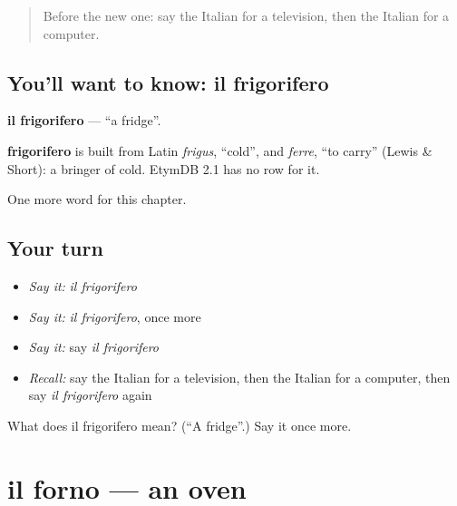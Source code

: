 \label{lesson:IT-C94-frigorifero}



\begin{quote}
Before the new one: say the Italian for a television, then the Italian for a computer.
\end{quote}

\subsection*{You'll want to know: il frigorifero}
\textbf{il frigorifero} — \textquotedblleft{}a fridge\textquotedblright{}.

\begin{cousinweb}
\textbf{frigorifero} is built from Latin \emph{frigus}, \textquotedblleft{}cold\textquotedblright{}, and \emph{ferre}, \textquotedblleft{}to carry\textquotedblright{} (Lewis \& Short): a bringer of cold. EtymDB 2.1 has no row for it.
\end{cousinweb}

\begin{grammarlens}[title={What you've built}]
One more word for this chapter.
\end{grammarlens}

\subsection*{Your turn}
\begin{itemize}
\raggedright
  \item \emph{Say it:} \emph{il frigorifero}
  \item \emph{Say it:} \emph{il frigorifero}, once more
  \item \emph{Say it:} say \emph{il frigorifero}
  \item \emph{Recall:} say the Italian for a television, then the Italian for a computer, then say \emph{il frigorifero} again
\end{itemize}

\begin{tcolorbox}[breakable,colback=teal!4,colframe=teal!35!black,title={Before you move on}]
What does il frigorifero mean? (\textquotedblleft{}A fridge\textquotedblright{}.) Say it once more.
\end{tcolorbox}
\section[il forno]{il forno — an oven}

\label{lesson:IT-C94-forno}



